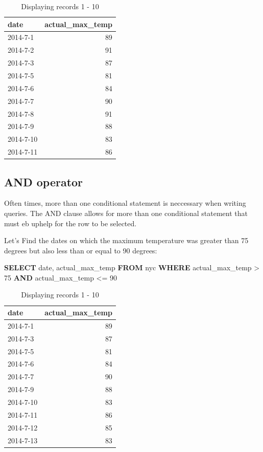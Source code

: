 \documentclass[]{book}
\newenvironment{Shaded}{\begin{snugshade}}{\end{snugshade}}
\newcommand{\KeywordTok}[1]{\textcolor[rgb]{0.13,0.29,0.53}{\textbf{#1}}}
\newcommand{\DataTypeTok}[1]{\textcolor[rgb]{0.13,0.29,0.53}{#1}}
\newcommand{\DecValTok}[1]{\textcolor[rgb]{0.00,0.00,0.81}{#1}}
\newcommand{\NormalTok}[1]{#1}
\begin{document}
\begin{table}

\caption{\label{tab:unnamed-chunk-68}Displaying records 1 - 10}
\centering
\begin{tabular}[t]{l|r}
\hline
date & actual\_max\_temp\\
\hline
2014-7-1 & 89\\
\hline
2014-7-2 & 91\\
\hline
2014-7-3 & 87\\
\hline
2014-7-5 & 81\\
\hline
2014-7-6 & 84\\
\hline
2014-7-7 & 90\\
\hline
2014-7-8 & 91\\
\hline
2014-7-9 & 88\\
\hline
2014-7-10 & 83\\
\hline
2014-7-11 & 86\\
\hline
\end{tabular}
\end{table}

\subsection{AND operator}\label{and-operator}

Often times, more than one conditional statement is neccessary when
writing queries. The AND clause allows for more than one conditional
statement that must eb uphelp for the row to be selected.

Let's Find the dates on which the maximum temperature was greater than
75 degrees but also less than or equal to 90 degrees:

\begin{Shaded}
\begin{Highlighting}[]
\KeywordTok{SELECT} \DataTypeTok{date}\NormalTok{, actual_max_temp }\KeywordTok{FROM}\NormalTok{ nyc }\KeywordTok{WHERE}\NormalTok{ actual_max_temp > }\DecValTok{75} \KeywordTok{AND}\NormalTok{ actual_max_temp <= }\DecValTok{90}
\end{Highlighting}
\end{Shaded}

\begin{table}

\caption{\label{tab:unnamed-chunk-69}Displaying records 1 - 10}
\centering
\begin{tabular}[t]{l|r}
\hline
date & actual\_max\_temp\\
\hline
2014-7-1 & 89\\
\hline
2014-7-3 & 87\\
\hline
2014-7-5 & 81\\
\hline
2014-7-6 & 84\\
\hline
2014-7-7 & 90\\
\hline
2014-7-9 & 88\\
\hline
2014-7-10 & 83\\
\hline
2014-7-11 & 86\\
\hline
2014-7-12 & 85\\
\hline
2014-7-13 & 83\\
\hline
\end{tabular}
\end{table}
\end{document}
